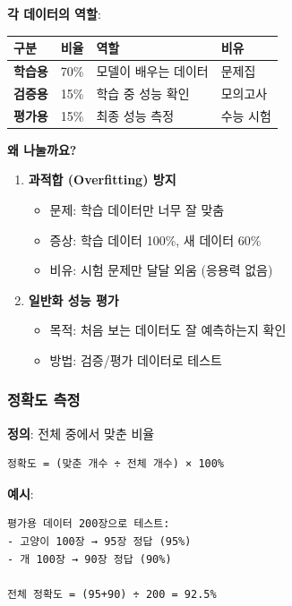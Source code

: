 \documentclass[a4paper, 11pt]{article}
\providecommand{\tightlist}{%
  \setlength{\itemsep}{0pt}\setlength{\parskip}{0pt}}
\begin{document}
\textbf{각 데이터의 역할}:

\begin{longtable}[]{@{}lcll@{}}
\toprule\noalign{}
구분 & 비율 & 역할 & 비유 \\
\midrule\noalign{}
\endhead
\bottomrule\noalign{}
\endlastfoot
\textbf{학습용} & 70\% & 모델이 배우는 데이터 & 문제집 \\
\textbf{검증용} & 15\% & 학습 중 성능 확인 & 모의고사 \\
\textbf{평가용} & 15\% & 최종 성능 측정 & 수능 시험 \\
\end{longtable}

\textbf{왜 나눌까요?}

\begin{enumerate}
\def\labelenumi{\arabic{enumi}.}
\tightlist
\item
  \textbf{과적합 (Overfitting) 방지}

  \begin{itemize}
  \tightlist
  \item
    문제: 학습 데이터만 너무 잘 맞춤
  \item
    증상: 학습 데이터 100\%, 새 데이터 60\%
  \item
    비유: 시험 문제만 달달 외움 (응용력 없음)
  \end{itemize}
\item
  \textbf{일반화 성능 평가}

  \begin{itemize}
  \tightlist
  \item
    목적: 처음 보는 데이터도 잘 예측하는지 확인
  \item
    방법: 검증/평가 데이터로 테스트
  \end{itemize}
\end{enumerate}

\hypertarget{uxc815uxd655uxb3c4-uxce21uxc815}{%
\subsubsection{정확도 측정}\label{uxc815uxd655uxb3c4-uxce21uxc815}}

\textbf{정의}: 전체 중에서 맞춘 비율

\begin{verbatim}
정확도 = (맞춘 개수 ÷ 전체 개수) × 100%
\end{verbatim}

\textbf{예시}:

\begin{verbatim}
평가용 데이터 200장으로 테스트:
- 고양이 100장 → 95장 정답 (95%)
- 개 100장 → 90장 정답 (90%)

전체 정확도 = (95+90) ÷ 200 = 92.5%
\end{verbatim}
\end{document}
